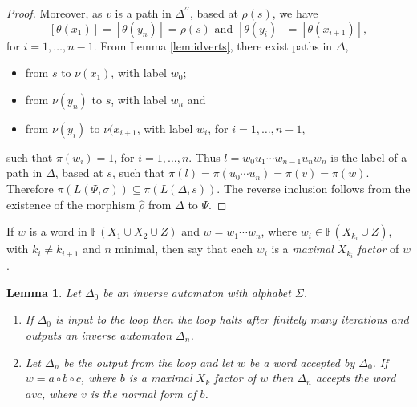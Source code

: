 \documentclass[a4paper,12pt]{article}
\renewcommand{\a}{\alpha }
\renewcommand{\b}{\beta }
\newcommand{\g}{\gamma }
\newcommand{\D}{\Delta }
\newcommand{\T}{\Theta }
\renewcommand{\L}{\Lambda }
\newcommand{\s}{\sigma }
\renewcommand{\S}{\Sigma }
\newtheorem{lemma}[theorem]{Lemma}
\numberwithin{equation}{section}
\numberwithin{figure}{section}
\newcommand{\FF}{\ensuremath{\mathbb{F}}}
\newcommand{\be}{\begin{enumerate}}
\newcommand{\ee}{\end{enumerate}}
\begin{document}
\begin{proof}
 Moreover, as $v$ is a path in $\D^{\prime\prime}$, based at $\rho(s)$, 
we have
\[[\theta(x_1)]=[\theta(y_n)]=\rho(s)\textrm{ and }[\theta(y_i)]=[\theta(x_{i+1})],\]
for $i=1,\ldots ,n-1$. From Lemma \ref{lem:idverts}, there exist paths in 
$\D$, 
\begin{itemize}
\item
from $s$ to $\nu(x_1)$, with label $w_0$;
\item  from $\nu(y_n)$ to $s$, with label $w_n$ and 
\item from $\nu(y_i)$ to $\nu(x_{i+1}$, with label $w_i$, for $i=1,\ldots,
n-1$,
\end{itemize}
such that $\pi(w_i)=1$, for $i=1,\ldots ,n$. Thus $l=w_0u_1\cdots w_{n-1}u_n
w_n$ is the label of a path in $\D$, based at $s$, such that
$\pi(l)=\pi(u_0\cdots u_n)=\pi(v)=\pi(w)$. 
 Therefore
$\pi(L(\Psi,\s))\subseteq \pi(L(\D,s))$. The reverse inclusion follows
from the existence of the morphism $\hat\rho$ from $\D$ to $\Psi$.

\end{proof}
If $w$ is a word in $\FF(X_1\cup X_2\cup Z)$ and $w=w_1\cdots w_n$,
where $w_i\in \FF(X_{k_i}\cup Z)$, with $k_i\neq k_{i+1}$ and $n$
minimal, then  say that each $w_i$ is a \emph {maximal} $X_{k_i}$
\emph{factor}
of $w$.
\begin{lemma}\label{lem:loopstop}
Let $\D_0$ be an inverse automaton with alphabet $\S$.
\be
\item\label{it:loopstop1}
If $\D_0$ is input  to  the loop then the loop halts after
finitely many iterations and outputs an inverse automaton  $\D_n$.
\item\label{it:loopstop2} Let $\D_n$ be the output from the loop and let $w$ be a word
accepted by $\D_0$. If $w=a\circ b \circ c$,
where $b$ is a maximal $X_k$ factor of $w$ then $\D_n$ accepts
the word $avc$, where $v$ is the normal form of $b$.
\ee
\end{lemma}
\end{document}
